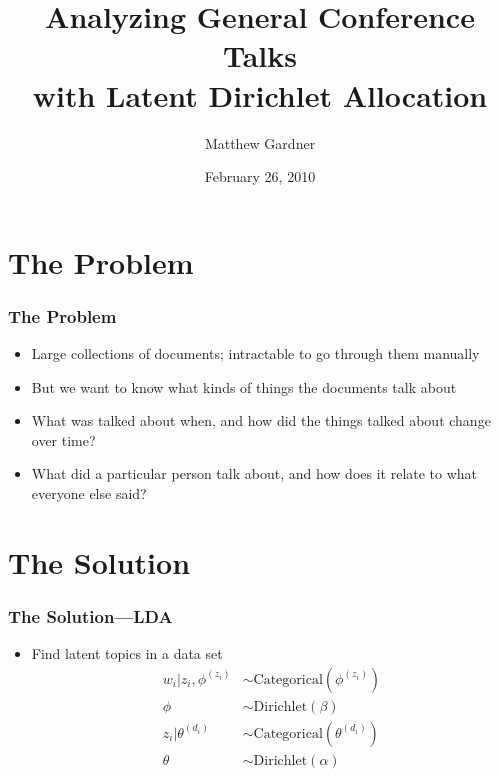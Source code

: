 \documentclass{beamer}
\author{Matthew Gardner}
\title{Analyzing General Conference Talks \\ with Latent Dirichlet Allocation}
\date{February 26, 2010}
\begin{document}
\begin{frame}
  \titlepage
\end{frame}

\section{The Problem}


\begin{frame}
  \frametitle{The Problem}
  \begin{itemize}
	\item Large collections of documents; intractable to go through them
	  manually
	  \pause
	\item But we want to know what kinds of things the documents talk about
	  \pause
	\item What was talked about when, and how did the things talked about
	  change over time?
	  \pause
	\item What did a particular person talk about, and how does it relate to
	  what everyone else said?
  \end{itemize}
\end{frame}

\section{The Solution}

\begin{frame}
  \frametitle{The Solution---LDA}
  \begin{itemize}
	\item Find latent topics in a data set
	  \begin{align*} 
		w_i|z_i,\phi^{(z_i)} &\sim \mathrm{Categorical}(\phi^{(z_i)}) \\
		\phi &\sim \mathrm{Dirichlet}(\beta) \\
		z_i|\theta^{(d_i)} &\sim \mathrm{Categorical}(\theta^{(d_i)}) \\ 
		\theta &\sim \mathrm{Dirichlet}(\alpha) 
	  \end{align*}
  \end{itemize}
\end{frame}
\end{document}
